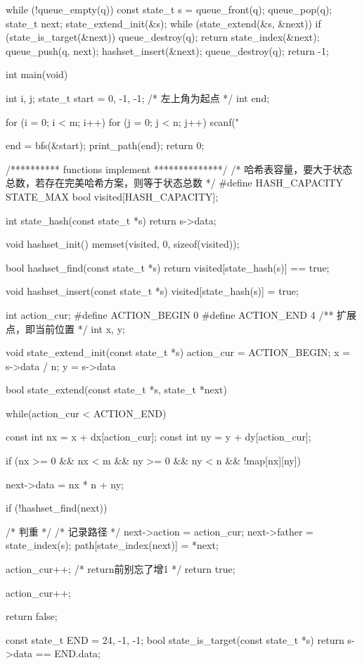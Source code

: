 \begin{Codex}[label=maze.c]
{    while (!queue_empty(q)) {
        const state_t s = queue_front(q);
        queue_pop(q);
        state_t next;
        state_extend_init(&s);
        while (state_extend(&s, &next)) {
            if (state_is_target(&next)) {
                queue_destroy(q);
                return state_index(&next);
            }
            queue_push(q, next);
            hashset_insert(&next);
        }
    }
    queue_destroy(q);
    return -1;
}

int main(void) {
    int i, j;
    state_t start = {0, -1, -1}; /* 左上角为起点 */
    int end;

    for (i = 0; i < m; i++) {
        for (j = 0; j < n; j++) {
            scanf("%
        }
    }

    end = bfs(&start);
    print_path(end);
    return 0;
}

/********** functions implement **************/
/* 哈希表容量，要大于状态总数，若存在完美哈希方案，则等于状态总数 */
#define HASH_CAPACITY STATE_MAX
bool visited[HASH_CAPACITY];

int state_hash(const state_t *s) {
    return s->data;
}

void hashset_init() {
    memset(visited, 0, sizeof(visited));
}

bool hashset_find(const state_t *s) {
    return visited[state_hash(s)] == true;
}

void hashset_insert(const state_t *s) {
    visited[state_hash(s)] = true;
}

int action_cur;
#define ACTION_BEGIN 0
#define ACTION_END 4
/** 扩展点，即当前位置 */
int x, y;

void state_extend_init(const state_t *s) {
    action_cur = ACTION_BEGIN;
    x = s->data / n;
    y = s->data %
}

bool state_extend(const state_t *s, state_t *next) {
    while(action_cur < ACTION_END) {
        const int nx = x + dx[action_cur];
        const int ny = y + dy[action_cur];

        if (nx >= 0 && nx < m && ny >= 0 && ny < n && !map[nx][ny]) {
            next->data = nx * n + ny;

            if (!hashset_find(next)) { /* 判重 */
                /* 记录路径 */
                next->action = action_cur;
                next->father = state_index(s);
                path[state_index(next)] = *next;

                action_cur++;  /* return前别忘了增1 */
                return true;
            }
        }
        action_cur++;
    }
    return false;
}

const state_t END = {24, -1, -1};
bool state_is_target(const state_t *s) {
    return s->data == END.data;
}
\end{Codex}

